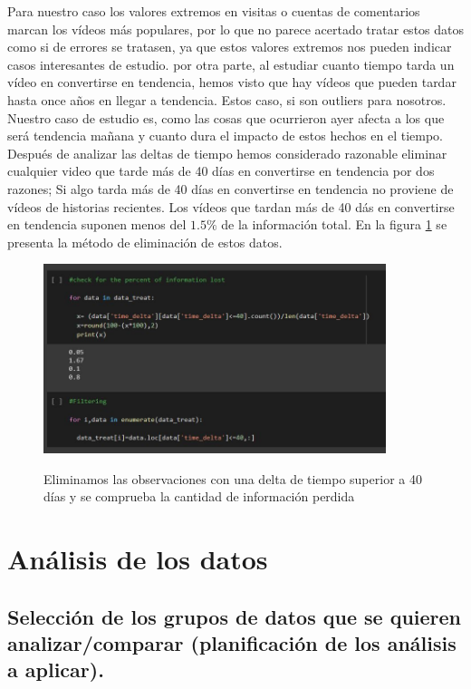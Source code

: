 \documentclass[a4paper,12pt]{article}
\begin{document}
Para nuestro caso los valores extremos en visitas o cuentas de comentarios marcan los v\'ideos m\'as populares, por lo que no parece acertado tratar estos datos como si de errores se tratasen, ya que estos valores extremos nos pueden indicar casos interesantes de estudio. por otra parte, al estudiar cuanto tiempo tarda un v\'ideo en convertirse  en tendencia, hemos visto que hay v\'ideos que pueden tardar hasta once a\~nos en llegar a tendencia. Estos caso, si son outliers  para nosotros. Nuestro caso de estudio es, como las cosas que ocurrieron ayer afecta a los que ser\'a tendencia ma\~nana y cuanto dura el impacto de estos hechos en el tiempo. Despu\'es de analizar las deltas de tiempo hemos considerado razonable eliminar cualquier video que tarde m\'as de 40 d\'ias en convertirse en tendencia por dos razones; Si algo tarda m\'as de 40 d\'ias en convertirse en tendencia no proviene de v\'ideos de historias recientes. Los v\'ideos que tardan m\'as de 40 d\'as en convertirse en tendencia suponen menos del $1.5\%$ de la informaci\'on total. En la figura \ref{fig:delta} se presenta la m\'etodo de eliminaci\'on de estos datos.

\begin{figure}[h!]
\centering
\includegraphics[width=10cm]{tiempo.JPG}\\
\caption{Eliminamos las observaciones con una delta de tiempo superior a 40 d\'ias y se comprueba la cantidad de informaci\'on perdida}
\label{fig:delta}
\end{figure}

\section{An\'alisis de los datos}

\subsection{Selecci\'on de los grupos de datos que se quieren analizar/comparar (planificaci\'on de los análisis a aplicar).}
\end{document}
